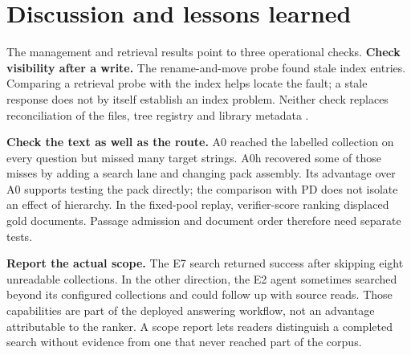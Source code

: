 \section{Discussion and lessons learned}
\label{sec:discussion}
The management and retrieval results point to three operational checks.
\textbf{Check visibility after a write.} The rename-and-move probe found
stale index entries. Comparing a retrieval probe with the index helps
locate the fault; a stale response does not by itself establish an index
problem. Neither check replaces reconciliation of the files, tree registry and
library metadata \citep{park-metadata-quality-2009,paivarinta-ecm-2005}.

\textbf{Check the text as well as the route.} A0 reached the labelled
collection on every question but missed many target strings. A0h recovered
some of those misses by adding a search lane and changing pack assembly.
Its advantage over A0 supports testing the pack directly; the comparison
with PD does not isolate an effect of hierarchy. In the fixed-pool replay,
verifier-score ranking displaced gold documents. Passage admission and
document order therefore need separate tests.

\textbf{Report the actual scope.} The E7 search returned success after
skipping eight unreadable collections. In the other direction, the E2
agent sometimes searched beyond its configured collections and could
follow up with source reads. Those capabilities are part of the deployed
answering workflow, not an advantage attributable to the ranker. A scope
report lets readers distinguish a completed search without evidence from
one that never reached part of the corpus.
